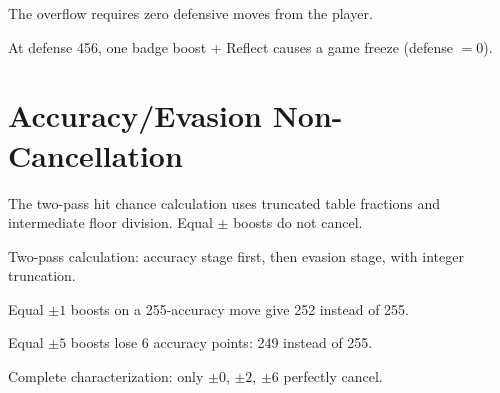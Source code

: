 \begin{theorem}\label{thm:no_player_action}
  \leanok
  The overflow requires zero defensive moves from the player.
\end{theorem}

\begin{theorem}\label{thm:badge_near_freeze}
  \leanok
  At defense 456, one badge boost + Reflect causes a game freeze (defense $= 0$).
\end{theorem}

\chapter{Accuracy/Evasion Non-Cancellation}\label{ch:acc_eva}

The two-pass hit chance calculation uses truncated table fractions
and intermediate floor division. Equal $\pm$ boosts do not cancel.

\begin{definition}[CalcHitChance]\label{def:calc_hit_chance}
  \leanok
  Two-pass calculation: accuracy stage first, then evasion stage, with integer truncation.
\end{definition}

\begin{theorem}\label{thm:plus1_reduces}
  \leanok
  Equal $\pm 1$ boosts on a 255-accuracy move give 252 instead of 255.
\end{theorem}

\begin{theorem}\label{thm:plus5_worst}
  \leanok
  Equal $\pm 5$ boosts lose 6 accuracy points: 249 instead of 255.
\end{theorem}

\begin{theorem}\label{thm:noncancellation_table}
  \leanok
  Complete characterization: only $\pm 0$, $\pm 2$, $\pm 6$ perfectly cancel.
\end{theorem}

